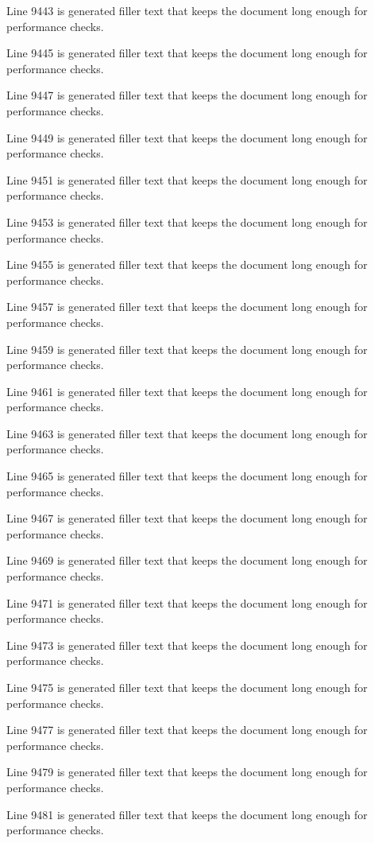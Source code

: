 Line 9443 is generated filler text that keeps the document long enough for performance checks.

Line 9445 is generated filler text that keeps the document long enough for performance checks.

Line 9447 is generated filler text that keeps the document long enough for performance checks.

Line 9449 is generated filler text that keeps the document long enough for performance checks.

Line 9451 is generated filler text that keeps the document long enough for performance checks.

Line 9453 is generated filler text that keeps the document long enough for performance checks.

Line 9455 is generated filler text that keeps the document long enough for performance checks.

Line 9457 is generated filler text that keeps the document long enough for performance checks.

Line 9459 is generated filler text that keeps the document long enough for performance checks.

Line 9461 is generated filler text that keeps the document long enough for performance checks.

Line 9463 is generated filler text that keeps the document long enough for performance checks.

Line 9465 is generated filler text that keeps the document long enough for performance checks.

Line 9467 is generated filler text that keeps the document long enough for performance checks.

Line 9469 is generated filler text that keeps the document long enough for performance checks.

Line 9471 is generated filler text that keeps the document long enough for performance checks.

Line 9473 is generated filler text that keeps the document long enough for performance checks.

Line 9475 is generated filler text that keeps the document long enough for performance checks.

Line 9477 is generated filler text that keeps the document long enough for performance checks.

Line 9479 is generated filler text that keeps the document long enough for performance checks.

Line 9481 is generated filler text that keeps the document long enough for performance checks.

